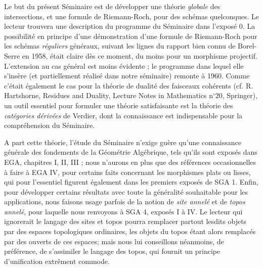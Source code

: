 










Le but du présent Séminaire est de développer une théorie \emph{globale} des intersections, 
et une formule de Riemann-Roch, pour des schémas quelconques. Le lecteur trouvera une description 
du programme du Séminaire dans l’exposé $0$. La possibilité en principe d’une démonstration d’une 
formule de Riemann-Roch pour les schémas \emph{réguliers} généraux, suivant les lignes du rapport 
bien connu de Borel-Serre en 1958, était claire dès ce moment, du moins pour un morphisme projectif. 
L’extension au cas général est moins évidente ; le programme dans lequel elle s’insère (et partiellement 
réalisé dans notre séminaire) remonte à 1960. Comme c’était également le cas pour la théorie de 
dualité des faisceaux cohérents (cf. R. Hartshorne, Residues and Duality, Lecture Notes in Mathematics 
n$^\circ 20$, Springer), un outil essentiel pour formuler une théorie satisfaisante est la théorie des 
\emph{catégories dérivées} de Verdier, dont la connaissance est indispensable pour la compréhension du 
Séminaire.

A part cette théorie, l’étude du Séminaire n’exige guère qu’une connaissance générale des fondements 
de la Géométrie Algébrique, tels qu’ils sont exposés dans EGA, chapitres I, II, III ; nous n’aurons en 
plus que des références occasionnelles à faire à EGA IV, pour certains faits concernant les morphismes 
plats ou lisses, qui pour l’essentiel figurent également dans les premiers exposés de SGA 1. Enfin, 
pour développer certains résultats avec toute la généralité souhaitable pour les applications, nous 
faisons usage parfois de la notion de \emph{site annelé} et de \emph{topos annelé}, pour laquelle nous 
renvoyons à SGA 4, exposés I à IV. Le lecteur qui ignorerait le langage des sites et topos pourra 
remplacer partout lesdits objets par des espaces topologiques ordinaires, les objets du topos étant 
alors remplacés par des ouverts de ces espaces; mais nous lui conseillons néanmoins, de préférence, 
de s’assimiler le langage des topos, qui fournit un principe d’unification extrêment commode.

